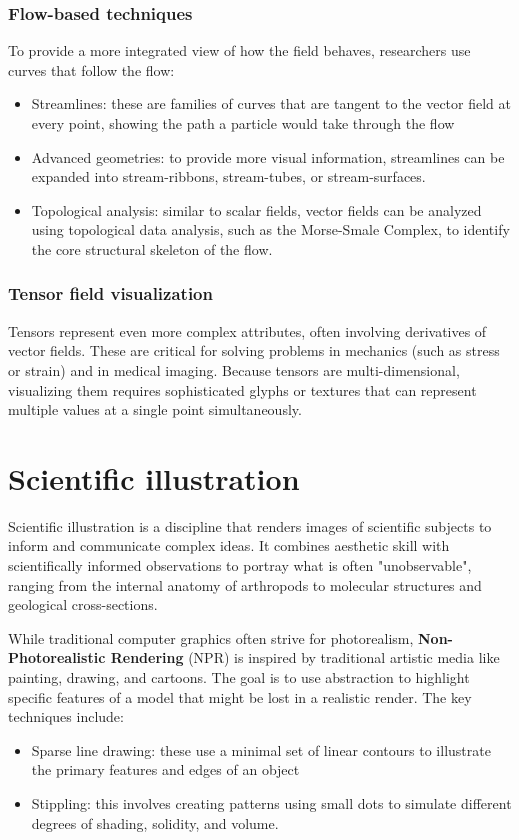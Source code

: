 \subsubsection{Flow-based techniques}
To provide a more integrated view of how the field behaves, researchers use curves that follow the flow:
\begin{itemize}[noitemsep]
    \item Streamlines: these are families of curves that are tangent to the vector field at every point, showing the path a particle would take through the flow
    \item Advanced geometries: to provide more visual information, streamlines can be expanded into stream-ribbons, stream-tubes, or stream-surfaces.
    \item Topological analysis: similar to scalar fields, vector fields can be analyzed using topological data analysis, such as the Morse-Smale Complex, to identify the core structural skeleton of the flow. 
\end{itemize}

\subsubsection{Tensor field visualization}
Tensors represent even more complex attributes, often involving derivatives of vector fields. These are critical for solving problems in mechanics (such as stress or strain) and in medical imaging. Because tensors are multi-dimensional, visualizing them requires sophisticated glyphs or textures that can represent multiple values at a single point simultaneously.

\section{Scientific illustration}
\begin{definition}
    Scientific illustration is a discipline that renders images of scientific subjects to inform and communicate complex ideas. It combines aesthetic skill with scientifically informed observations to portray what is often "unobservable", ranging from the internal anatomy of arthropods to molecular structures and geological cross-sections.
\end{definition}

While traditional computer graphics often strive for photorealism, \textbf{Non-Photorealistic Rendering} (NPR) is inspired by traditional artistic media like painting, drawing, and cartoons. The goal is to use abstraction to highlight specific features of a model that might be lost in a realistic render. The key techniques include:
\begin{itemize}[noitemsep]
    \item Sparse line drawing: these use a minimal set of linear contours to illustrate the primary features and edges of an object
    \item Stippling: this involves creating patterns using small dots to simulate different degrees of shading, solidity, and volume.
\end{itemize}

